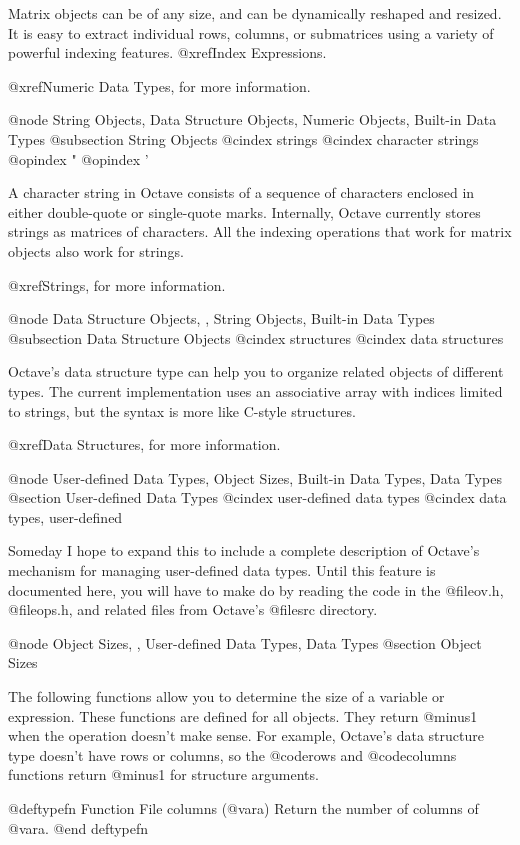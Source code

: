 Matrix objects can be of any size, and can be dynamically reshaped and
resized.  It is easy to extract individual rows, columns, or submatrices
using a variety of powerful indexing features.  @xref{Index Expressions}.

@xref{Numeric Data Types}, for more information.

@node String Objects, Data Structure Objects, Numeric Objects, Built-in Data Types
@subsection String Objects
@cindex strings
@cindex character strings
@opindex "
@opindex '

A character string in Octave consists of a sequence of characters
enclosed in either double-quote or single-quote marks.  Internally,
Octave currently stores strings as matrices of characters.  All the
indexing operations that work for matrix objects also work for strings.

@xref{Strings}, for more information.

@node Data Structure Objects,  , String Objects, Built-in Data Types
@subsection Data Structure Objects
@cindex structures
@cindex data structures

Octave's data structure type can help you to organize related objects of
different types.  The current implementation uses an associative array
with indices limited to strings, but the syntax is more like C-style
structures.

@xref{Data Structures}, for more information.

@node User-defined Data Types, Object Sizes, Built-in Data Types, Data Types
@section User-defined Data Types
@cindex user-defined data types
@cindex data types, user-defined

Someday I hope to expand this to include a complete description of
Octave's mechanism for managing user-defined data types.  Until this
feature is documented here, you will have to make do by reading the code
in the @file{ov.h}, @file{ops.h}, and related files from Octave's
@file{src} directory.

@node Object Sizes,  , User-defined Data Types, Data Types
@section Object Sizes

The following functions allow you to determine the size of a variable or
expression.  These functions are defined for all objects.  They return
@minus{}1 when the operation doesn't make sense.  For example, Octave's
data structure type doesn't have rows or columns, so the @code{rows} and
@code{columns} functions return @minus{}1 for structure arguments.

@deftypefn {Function File} {} columns (@var{a})
Return the number of columns of @var{a}.
@end deftypefn

